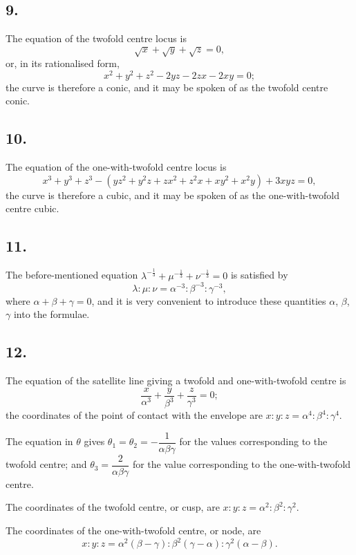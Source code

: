 \documentclass[11pt,a4paper]{article}
\theoremstyle{definition}
\begin{document}
\newpage
\subsection*{9.}

The equation of the twofold centre locus is
\[
\sqrt{x} + \sqrt{y} + \sqrt{z} = 0,
\]
or, in its rationalised form,
\[
x^{2} + y^{2} + z^{2} - 2yz - 2zx - 2xy = 0;
\]
the curve is therefore a conic, and it may be spoken of as the twofold centre conic.

\subsection*{10.}

The equation of the one-with-twofold centre locus is
\[
x^{3} + y^{3} + z^{3} - (yz^{2} + y^{2}z + zx^{2} + z^{2}x + xy^{2} + x^{2}y) + 3xyz = 0,
\]
the curve is therefore a cubic, and it may be spoken of as the one-with-twofold
centre cubic.

\subsection*{11.}

The before-mentioned equation $\lambda^{-\frac{1}{3}} + \mu^{-\frac{1}{3}} + \nu^{-\frac{1}{3}} = 0$ is satisfied by
\[
\lambda : \mu : \nu = \alpha^{-3} : \beta^{-3} : \gamma^{-3},
\]
where $\alpha + \beta + \gamma = 0$, and it is very convenient to introduce these quantities $\alpha$, $\beta$, $\gamma$ into
the formulae.

\newpage
\subsection*{12.}

The equation of the satellite line giving a twofold and one-with-twofold centre is
\[
\frac{x}{\alpha^{3}} + \frac{y}{\beta^{3}} + \frac{z}{\gamma^{3}} = 0;
\]
the coordinates of the point of contact with the envelope are $x : y : z = \alpha^{4} : \beta^{4} : \gamma^{4}$.

The equation in $\theta$ gives $\theta_{1} = \theta_{2} = -\dfrac{1}{\alpha\beta\gamma}$ for the values corresponding to the twofold
centre; and $\theta_{3} = \dfrac{2}{\alpha\beta\gamma}$ for the value corresponding to the one-with-twofold centre.

The coordinates of the twofold centre, or cusp, are $x : y : z = \alpha^{2} : \beta^{2} : \gamma^{2}$.

The coordinates of the one-with-twofold centre, or node, are
\[
x : y : z = \alpha^{2}(\beta - \gamma) : \beta^{2}(\gamma - \alpha) : \gamma^{2}(\alpha - \beta).
\]
\end{document}
